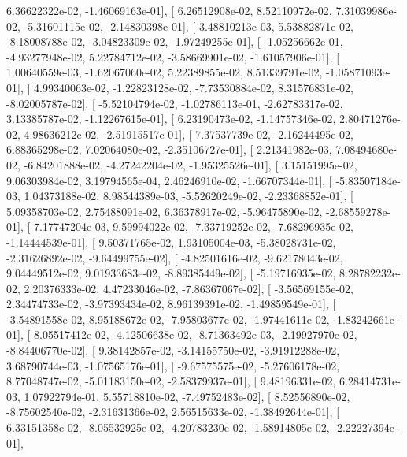 \documentclass{article}
\begin{document}
          6.36622322e-02,  -1.46069163e-01],
       [  6.26512908e-02,   8.52110972e-02,   7.31039986e-02,
         -5.31601115e-02,  -2.14830398e-01],
       [  3.48810213e-03,   5.53882871e-02,  -8.18008788e-02,
         -3.04823309e-02,  -1.97249255e-01],
       [ -1.05256662e-01,  -4.93277948e-02,   5.22784712e-02,
         -3.58669901e-02,  -1.61057906e-01],
       [  1.00640559e-03,  -1.62067060e-02,   5.22389855e-02,
          8.51339791e-02,  -1.05871093e-01],
       [  4.99340063e-02,  -1.22823128e-02,  -7.73530884e-02,
          8.31576831e-02,  -8.02005787e-02],
       [ -5.52104794e-02,  -1.02786113e-01,  -2.62783317e-02,
          3.13385787e-02,  -1.12267615e-01],
       [  6.23190473e-02,  -1.14757346e-02,   2.80471276e-02,
          4.98636212e-02,  -2.51915517e-01],
       [  7.37537739e-02,  -2.16244495e-02,   6.88365298e-02,
          7.02064080e-02,  -2.35106727e-01],
       [  2.21341982e-03,   7.08494680e-02,  -6.84201888e-02,
         -4.27242204e-02,  -1.95325526e-01],
       [  3.15151995e-02,   9.06303984e-02,   3.19794565e-04,
          2.46246910e-02,  -1.66707344e-01],
       [ -5.83507184e-03,   1.04373188e-02,   8.98544389e-03,
         -5.52620249e-02,  -2.23368852e-01],
       [  5.09358703e-02,   2.75488091e-02,   6.36378917e-02,
         -5.96475890e-02,  -2.68559278e-01],
       [  7.17747204e-03,   9.59994022e-02,  -7.33719252e-02,
         -7.68296935e-02,  -1.14444539e-01],
       [  9.50371765e-02,   1.93105004e-03,  -5.38028731e-02,
         -2.31626892e-02,  -9.64499755e-02],
       [ -4.82501616e-02,  -9.62178043e-02,   9.04449512e-02,
          9.01933683e-02,  -8.89385449e-02],
       [ -5.19716935e-02,   8.28782232e-02,   2.20376333e-02,
          4.47233046e-02,  -7.86367067e-02],
       [ -3.56569155e-02,   2.34474733e-02,  -3.97393434e-02,
          8.96139391e-02,  -1.49859549e-01],
       [ -3.54891558e-02,   8.95188672e-02,  -7.95803677e-02,
         -1.97441611e-02,  -1.83242661e-01],
       [  8.05517412e-02,  -4.12506638e-02,  -8.71363492e-03,
         -2.19927970e-02,  -8.84406770e-02],
       [  9.38142857e-02,  -3.14155750e-02,  -3.91912288e-02,
          3.68790744e-03,  -1.07565176e-01],
       [ -9.67575575e-02,  -5.27606178e-02,   8.77048747e-02,
         -5.01183150e-02,  -2.58379937e-01],
       [  9.48196331e-02,   6.28414731e-03,   1.07922794e-01,
          5.55718810e-02,  -7.49752483e-02],
       [  8.52556890e-02,  -8.75602540e-02,  -2.31631366e-02,
          2.56515633e-02,  -1.38492644e-01],
       [  6.33151358e-02,  -8.05532925e-02,  -4.20783230e-02,
         -1.58914805e-02,  -2.22227394e-01],
\end{document}
